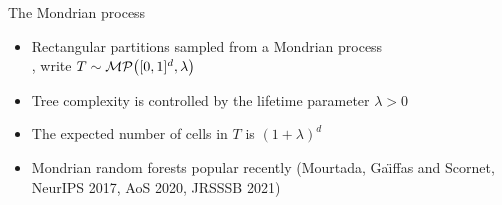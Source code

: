 \documentclass{beamer}
\begin{document}
\begin{frame}{The Mondrian process}

  \vspace*{1mm}
  \begin{itemize}
    \item Rectangular partitions
      sampled from a Mondrian process \\
      \citep{roy2008mondrian}, write
      $T \sim \mathcal{MP}\big([0,1]^d, \lambda\big)$
    \item Tree complexity is controlled by the
      \alert{lifetime parameter} $\lambda > 0$
    \item The expected number of cells in $T$ is $(1+\lambda)^d$
    \item Mondrian random forests popular recently
      (Mourtada, Ga{\"\i}ffas and Scornet,
      NeurIPS 2017, AoS 2020, JRSSSB 2021)
  \end{itemize}


\end{frame}
\end{document}
